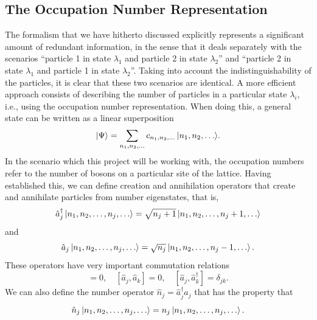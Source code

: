 \documentclass[a4paper, 10pt]{article}
\theoremstyle{plain}
\begin{document}
\subsection{The Occupation Number Representation}

The formalism that we have hitherto discussed explicitly represents a
significant amount of redundant information, in the sense that it deals
separately with the scenarios ``particle 1 in state $\lambda_1$ and particle 2
in state $\lambda_{2}$'' and ``particle 2 in state $\lambda_1$ and particle 1 in
state $\lambda_{2}$''. Taking into account the indistinguishability of the
particles, it is clear that these two scenarios are identical. A more efficient
approach consists of describing the number of particles in a particular state
$\lambda_i$, i.e., using the occupation number representation. When doing this,
a general state can be written as a linear superposition
\begin{equation}
    \ket{\Psi}
    =
    \sum_{n_{1}, n_{2}, \dots}%
        {c_{n_{1}, n_{2}, \dots}\ket{n_{1}, n_{2}, \dots}}.
\end{equation}
In the scenario which this project will be working with, the occupation numbers
refer to the number of bosons on a particular site of the lattice. Having
established this, we can define creation and annihilation operators that create
and annihilate particles from number eigenstates, that is,
\begin{equation}
    \hat{a}_{j}^{\dagger} \ket{n_{1}, n_{2}, \dots, n_{j}, \dots}
    =
    \sqrt{n_{j} + 1} \ket{n_{1}, n_{2}, \dots, n_{j}+1, \dots}
\end{equation}
and
\begin{equation}
    \hat{a}_{j} \ket{n_{1}, n_{2}, \dots, n_{j}, \dots}
    =
    \sqrt{n_{j}} \ket{n_{1}, n_{2}, \dots, n_{j}-1, \dots}.
\end{equation}
These operators have very important commutation relations
\begin{equation}
    [ \hat{a}_{j}^{\dagger}, \hat{a}_{k}^{\dagger}] = 0, \quad
    [ \hat{a}_{j}, \hat{a}_{k}]=0, \quad
    [\hat{a}_{j},\hat{a}_{k}^{\dagger}]=\delta_{jk}.
\end{equation}
We can also define the number operator $\hat{n}_{j} = \hat{a}_{j}^{\dagger}
\hat{a}_{j}$ that has the property that
\begin{equation}
    \hat{n}_{j} \ket{n_{1}, n_{2}, \dots, n_{j}, \dots}
    =
    n_{j} \ket{n_{1}, n_{2}, \dots, n_{j}, \dots}.
\end{equation}
\end{document}
